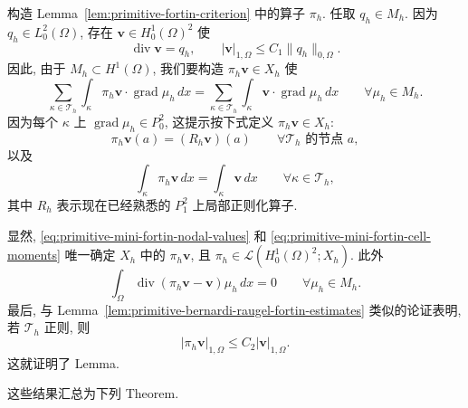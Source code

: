 \begin{Proof}
构造 Lemma~\ref{lem:primitive-fortin-criterion} 中的算子 $\pi_h$.
任取 $q_h\in M_h$. 因为 $q_h\in L_0^2(\Omega)$, 存在
$\mathbf v\in H_0^1(\Omega)^2$ 使
\begin{equation}\label{eq:primitive-mini-divergence-lifting}
\operatorname{div}\mathbf v=q_h,
\qquad |\mathbf v|_{1,\Omega}\leq C_1\|q_h\|_{0,\Omega}.
\end{equation}
因此, 由于 $M_h\subset H^1(\Omega)$, 我们要构造
$\pi_h\mathbf v\in X_h$ 使
\[
\sum_{\kappa\in\mathcal T_h}\int_\kappa
\pi_h\mathbf v\cdot\operatorname{grad}\mu_h\,dx
=\sum_{\kappa\in\mathcal T_h}\int_\kappa
\mathbf v\cdot\operatorname{grad}\mu_h\,dx
\qquad\forall\mu_h\in M_h.
\]
因为每个 $\kappa$ 上 $\operatorname{grad}\mu_h\in P_0^2$, 这提示按下式定义
$\pi_h\mathbf v\in X_h$:
\begin{equation}\label{eq:primitive-mini-fortin-nodal-values}
\pi_h\mathbf v(a)=(R_h\mathbf v)(a)
\qquad\forall\mathcal T_h\text{ 的节点 }a,
\end{equation}
以及
\begin{equation}\label{eq:primitive-mini-fortin-cell-moments}
\int_\kappa\pi_h\mathbf v\,dx
=\int_\kappa\mathbf v\,dx
\qquad\forall\kappa\in\mathcal T_h,
\end{equation}
其中 $R_h$ 表示现在已经熟悉的 $P_1^2$ 上局部正则化算子.

显然, \eqref{eq:primitive-mini-fortin-nodal-values} 和
\eqref{eq:primitive-mini-fortin-cell-moments} 唯一确定 $X_h$ 中的
$\pi_h\mathbf v$, 且
$\pi_h\in\mathcal L(H_0^1(\Omega)^2;X_h)$. 此外
\[
\int_\Omega\operatorname{div}(\pi_h\mathbf v-\mathbf v)\mu_h\,dx=0
\qquad\forall\mu_h\in M_h.
\]
最后, 与 Lemma~\ref{lem:primitive-bernardi-raugel-fortin-estimates}
类似的论证表明, 若 $\mathcal T_h$ 正则, 则
\[
|\pi_h\mathbf v|_{1,\Omega}\leq C_2|\mathbf v|_{1,\Omega}.
\]
这就证明了 Lemma.
\end{Proof}

这些结果汇总为下列 Theorem.


